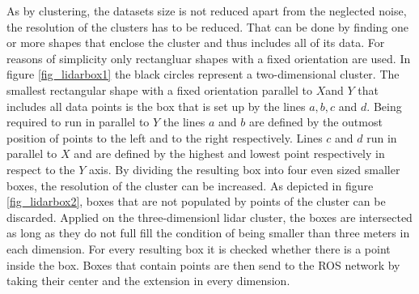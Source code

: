 As by clustering, the datasets size is not reduced apart from the neglected noise, the resolution of the clusters has to be reduced. That can be done by finding one or more shapes that enclose the cluster and thus includes all of its data. For reasons of simplicity only rectangluar shapes with a fixed orientation are used. In figure \ref{fig_lidarbox1} the black circles represent a two-dimensional cluster. The smallest rectangular shape with a fixed orientation parallel to $X$and $Y$ that includes all data points is the box that is set up by the lines $a,b,c$ and $d$. Being required to run in parallel to $Y$ the lines $a$ and $b$ are defined by the outmost position of points to the left and to the right respectively. Lines $c$ and $d$ run in parallel to $X$ and are defined by the highest and lowest point respectively in respect to the $Y$ axis. By dividing the resulting box into four even sized smaller boxes, the resolution of the cluster can be increased. As depicted in figure  \ref{fig_lidarbox2}, boxes that are not populated by points of the cluster can be discarded. Applied on the three-dimensionl lidar cluster, the boxes are intersected as long as they do not full fill the condition of being smaller than three meters in each dimension. For every resulting box it is checked whether there is a point inside the box. Boxes that contain points are then send to the \ac{ROS} network by taking their center and the extension in every dimension. \\

